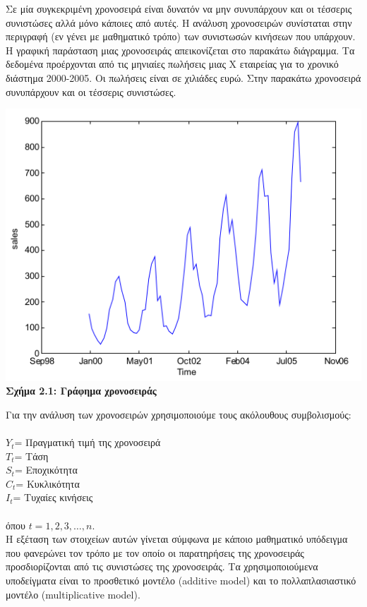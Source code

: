 Σε μία συγκεκριμένη χρονοσειρά είναι δυνατόν να μην συνυπάρχουν και οι
τέσσερις συνιστώσες αλλά μόνο κάποιες από αυτές. Η ανάλυση χρονοσειρών
συνίσταται στην περιγραφή (εν γένει με μαθηματικό τρόπο) των συνιστωσών
κινήσεων που υπάρχουν. Η γραφική παράσταση μιας χρονοσειράς απεικονίζεται στο
παρακάτω διάγραμμα. Τα δεδομένα προέρχονται από τις μηνιαίες πωλήσεις μιας Χ
εταιρείας για το χρονικό διάστημα 2000-2005. Οι πωλήσεις είναι σε χιλιάδες ευρώ.
Στην παρακάτω χρονοσειρά συνυπάρχουν και οι τέσσερις συνιστώσες.\\
\begin{center}
\includegraphics[scale=0.7]{graf2.png}\\   
\textbf{Σχήμα 2.1: Γράφημα χρονοσειράς}
\end{center} 
\linespread{1}

Για την ανάλυση των χρονοσειρών χρησιμοποιούμε τους ακόλουθους
συμβολισμούς:\\
\\
$Y_t$= Πραγματική τιμή της χρονοσειρά\\
$T_t$= Τάση\\
$S_t$= Εποχικότητα\\
$C_t$= Κυκλικότητα\\
$I_t$= Τυχαίες κινήσεις\\  \\
όπου $t = 1,2,3,\ldots,n$.\\


Η εξέταση των στοιχείων αυτών γίνεται σύμφωνα με κάποιο μαθηματικό
υπόδειγμα που φανερώνει τον τρόπο με τον οποίο οι παρατηρήσεις της χρονοσειράς
προσδιορίζονται από τις συνιστώσες της χρονοσειράς. Τα χρησιμοποιούμενα υποδείγματα είναι το προσθετικό μοντέλο (additive model) και το πολλαπλασιαστικό
μοντέλο (multiplicative model).


